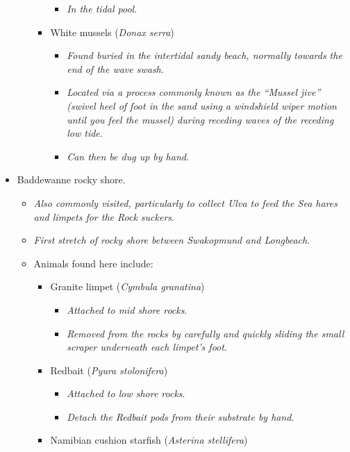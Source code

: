 \documentclass[
  12pt,
]{report}
\providecommand{\tightlist}{%
  \setlength{\itemsep}{0pt}\setlength{\parskip}{0pt}}\usepackage{longtable,booktabs,array}
\begin{document}
\begin{itemize}
\begin{itemize}
\begin{itemize}
      \begin{itemize}
      \tightlist
      \item
        \emph{In the tidal pool}.
      \end{itemize}
    \item
      White mussels (\emph{Donax serra})

      \begin{itemize}
      \tightlist
      \item
        \emph{Found buried in the intertidal sandy beach, normally
        towards the end of the wave swash}.
      \item
        \emph{Located via a process commonly known as the ``Mussel
        jive'' (swivel heel of foot in the sand using a windshield wiper
        motion until you feel the mussel) during receding waves of the
        receding low tide}.
      \item
        \emph{Can then be dug up by hand}.
      \end{itemize}
    \end{itemize}
  \end{itemize}
\item
  Baddewanne rocky shore.

  \begin{itemize}
  \tightlist
  \item
    \emph{Also commonly visited, particularly to collect Ulva to feed
    the Sea hares and limpets for the Rock suckers}.
  \item
    \emph{First stretch of rocky shore between Swakopmund and
    Longbeach}.
  \item
    Animals found here include:

    \begin{itemize}
    \tightlist
    \item
      Granite limpet (\emph{Cymbula granatina})

      \begin{itemize}
      \tightlist
      \item
        \emph{Attached to mid shore rocks}.
      \item
        \emph{Removed from the rocks by carefully and quickly sliding
        the small scraper underneath each limpet's foot}.
      \end{itemize}
    \item
      Redbait (\emph{Pyura stolonifera})

      \begin{itemize}
      \tightlist
      \item
        \emph{Attached to low shore rocks}.
      \item
        \emph{Detach the Redbait pods from their substrate by hand}.
      \end{itemize}
    \item
      Namibian cushion starfish (\emph{Asterina stellifera})


\end{itemize}
\end{itemize}
\end{itemize}
\end{document}
